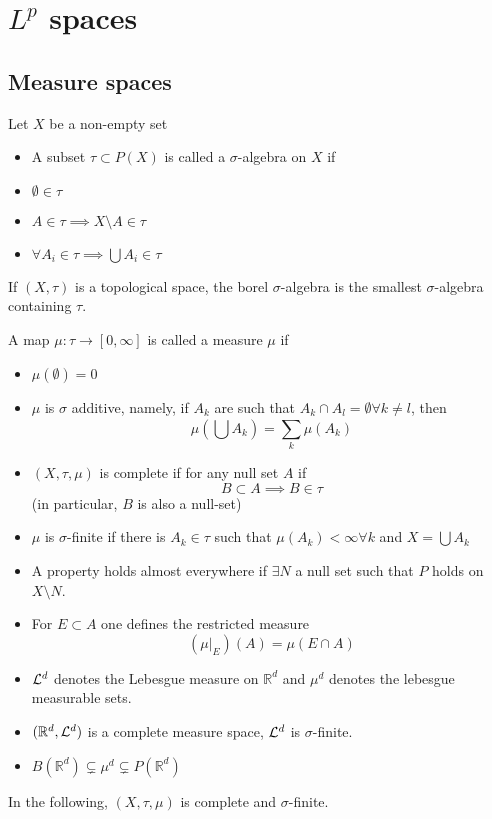 \documentclass[../main.tex]{subfiles}
\begin{document}
\section{$L^{p}$ spaces}
\subsection{Measure spaces}
\begin{defn}
	Let $X$ be a non-empty set
	\begin{itemize}
	\item A subset $\tau \subset P( X) $ is called a $\sigma$-algebra on $X$ if
	\item $\emptyset \in \tau$ 
	\item $A\in \tau \implies X\setminus A \in \tau$ 
	\item $\forall A_i \in \tau \implies \bigcup A_i \in \tau$ 
	\end{itemize}
\end{defn}
If $( X,\tau) $ is a topological space, the borel $\sigma$-algebra is the smallest $\sigma$-algebra containing $\tau$.
\begin{defn}
	A map $\mu :\tau \to [ 0, \infty ]  $ is called a measure $\mu$ if
	\begin{itemize}
	\item $\mu( \emptyset) =0$ 
	\item $\mu$ is $\sigma$ additive, namely, if $A_k$ are such that $A_k \cap A_l= \emptyset \forall k\neq l$, then
		\[ 
		\mu( \bigcup A_k) = \sum_{k}^{ } \mu( A_k) 
		\]
	
	\item $( X,\tau,\mu) $ is complete if for any null set $A$ if
		\[ 
		B \subset A\implies B \in \tau
		\]
		(in particular, $B$ is also a null-set) 
	\item $\mu$ is $\sigma$-finite if there is $A_k \in \tau$ such that $\mu( A_k) < \infty \forall k $ and $X= \bigcup A_k$
	\item A property holds almost everywhere if $\exists N$ a null set such that $P$ holds on $X\setminus N$.
	\item For $E \subset A$ one defines the restricted measure
		\[ 
			( \mu|_E) ( A) = \mu( E\cap A) 
		\]
		
	\item $\mathcal{L}^{d}$ denotes the Lebesgue measure on $ \mathbb{R}^{d}$ and $\mu^{d}$ denotes the lebesgue measurable sets.
	\end{itemize}
\end{defn}
\begin{rmq}
\begin{itemize}
\item $ ( \mathbb{R}^{d}, \mathcal{L}^{d}) $ is a complete measure space, $\mathcal{L}^{d}$ is $\sigma$-finite.
\item $B( \mathbb{R}^{d}) \subsetneq \mu^{d} \subsetneq P( \mathbb{R}^{d})  $ 
\end{itemize}
\end{rmq}
In the following, $( X,\tau, \mu) $ is complete and $\sigma$-finite.
\end{document}

